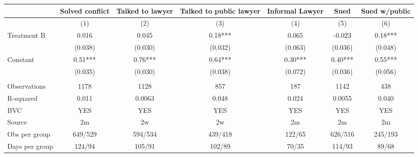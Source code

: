\begin{tabular}{lcccccc}
\toprule
      & Solved conflict & \multicolumn{1}{l}{Talked to lawyer} & \multicolumn{1}{l}{Talked to public lawyer} & \multicolumn{1}{l}{Informal Lawyer} & Sued  & \multicolumn{1}{l}{Sued w/public} \\
\midrule
\midrule
      & (1)   & (2)   & (3)   & (4)   & (5)   & (6) \\
\midrule
\midrule
Treatment B & 0.016 & 0.045 & 0.18*** & 0.065 & -0.023 & 0.18*** \\
      & (0.038) & (0.030) & (0.032) & (0.063) & (0.036) & (0.048) \\
Constant  & 0.51*** & 0.76*** & 0.64*** & 0.30*** & 0.40*** & 0.55*** \\
      & (0.035) & (0.030) & (0.038) & (0.072) & (0.036) & (0.056) \\
      &       &       &       &       &       &  \\
\midrule
Observations & 1178  & 1128  & 857   & 187   & 1142  & 438 \\
R-squared & 0.011 & 0.0063 & 0.048 & 0.024 & 0.0055 & 0.040 \\
BVC   & YES   & YES   & YES   & YES   & YES   & YES \\
Source & 2m    & 2w    & 2w    & 2m    & 2m    & 2m \\
Obs per group & 649/529 & 594/534 & 439/418 & 122/65 & 626/516 & 245/193 \\
Days per group & 124/94 & 105/91 & 102/89 & 70/35 & 114/93 & 89/68 \\
\bottomrule
\bottomrule
\end{tabular}%
